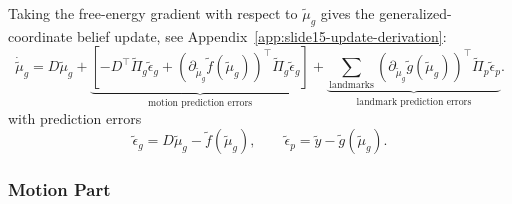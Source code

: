  Taking the free-energy gradient with respect to $\tilde{\mu}_{g}$ gives the generalized-coordinate belief update, see Appendix~\ref{app:slide15-update-derivation}:
\begin{equation}
    \dot{\tilde{\mu}}_{g}
    =
    D\tilde{\mu}_{g}
    +
    \underbrace{
        \left[
            -
            D^\top \tilde{\Pi}_{g}\tilde{\epsilon}_{g}
            +
            \left(
                \partial_{\tilde\mu_g}\tilde{f}(\tilde{\mu}_{g})
            \right)^\top
            \tilde{\Pi}_{g}\tilde{\epsilon}_{g}
        \right]
    }_{\text{motion prediction errors}}
    +
    \underbrace{
        \sum_{\mathrm{landmarks}}
        \left(
            \partial_{\tilde\mu_g}\tilde{g}(\tilde{\mu}_{g})
        \right)^\top
        \tilde{\Pi}_{p}\tilde{\epsilon}_{p}
    }_{\text{landmark prediction errors}}.
    \label{eq:slide15-generic-update}
\end{equation}
with prediction errors
\begin{equation}
    \tilde{\epsilon}_g
    =
    D\tilde{\mu}_g
    -
    \tilde{f}(\tilde{\mu}_g),
    \qquad
    \tilde{\epsilon}_p
    =
    \tilde{y}
    -
    \tilde{g}(\tilde{\mu}_g).
    \label{eq:prediction-errors}
\end{equation}

\subsubsection{Motion Part}
\label{subsec:gradient-motion}

